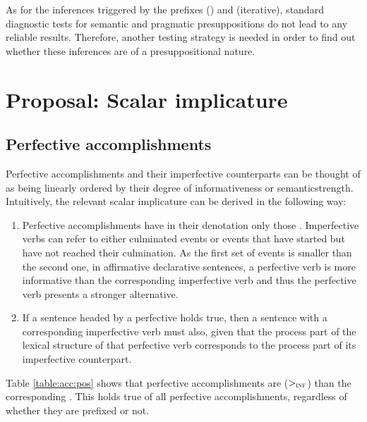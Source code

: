 As for the inferences triggered by the prefixes  () and  (iterative), standard diagnostic tests for semantic and pragmatic presuppositions do not lead to any reliable results. Therefore, another testing strategy is needed in order to find out whether these inferences are of a presuppositional nature. 

\section{Proposal: Scalar implicature}\label{sec:pragm:new}
\subsection{Perfective accomplishments}\label{sec:pragm:new:perf}
Perfective accomplishments and their imperfective counterparts can be thought of as being linearly ordered by their degree of informativeness or semantic\linebreak strength.
Intuitively, the relevant scalar implicature can be derived in the following way:

\begin{enumerate}
\item
Perfective accomplishments have in their denotation only those . Imperfective verbs can refer to either culminated events or events that have started but have not reached their culmination. As the first set of events is smaller than the second one, in affirmative declarative sentences, a perfective verb is more informative than the corresponding imperfective verb and thus the perfective verb presents a stronger alternative.
\item If a sentence headed by a perfective  holds true, then a sentence with a corresponding imperfective verb must also, given that the process part of the lexical structure of that perfective verb corresponds to the process part of its imperfective counterpart.
\end{enumerate}
Table \ref{table:acc:pos} shows that perfective accomplishments are  ($>_{\textsc{inf}}$) than the corresponding . This holds true of all perfective accomplishments, regardless of whether they are prefixed or not.

